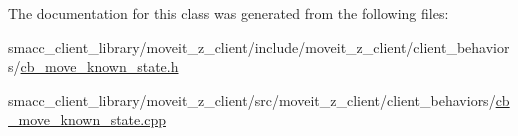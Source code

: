 The documentation for this class was generated from the following files\+:\begin{DoxyCompactItemize}
\item 
smacc\+\_\+client\+\_\+library/moveit\+\_\+z\+\_\+client/include/moveit\+\_\+z\+\_\+client/client\+\_\+behaviors/\hyperlink{cb__move__known__state_8h}{cb\+\_\+move\+\_\+known\+\_\+state.\+h}\item 
smacc\+\_\+client\+\_\+library/moveit\+\_\+z\+\_\+client/src/moveit\+\_\+z\+\_\+client/client\+\_\+behaviors/\hyperlink{cb__move__known__state_8cpp}{cb\+\_\+move\+\_\+known\+\_\+state.\+cpp}\end{DoxyCompactItemize}
